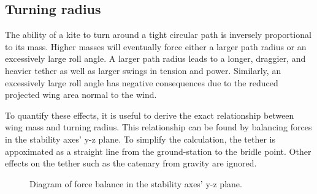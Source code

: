\documentclass[11pt]{amsart}
\newcommand{\cw}{\mathrm{cw}}
\begin{document}
{\subsection{Turning radius}

The ability of a kite to turn around a tight circular path is
inversely proportional to its mass.  Higher masses will eventually
force either a larger path radius or an excessively large roll angle.
A larger path radius leads to a longer, draggier, and heavier tether
as well as larger swings in tension and power.  Similarly, an
excessively large roll angle has negative consequences due to the
reduced projected wing area normal to the wind.

To quantify these effects, it is useful to derive the exact
relationship between wing mass and turning radius.  This relationship
can be found by balancing forces in the stability axes' y-z plane.  To
simplify the calculation, the tether is appoximated as a straight line
from the ground-station to the bridle point.  Other effects on the
tether such as the catenary from gravity are ignored.

\begin{figure}[h]
\begin{center}
  \caption{Diagram of force balance in the stability axes' y-z plane.}
\end{center}
\end{figure}

}
\end{document}
